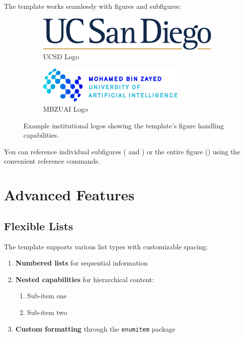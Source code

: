 \documentclass{triton}
\begin{document}
The template works seamlessly with figures and subfigures:

\begin{figure}[h]
    \centering
    \begin{subfigure}{0.45\textwidth}
        \centering
        \includegraphics[width=\textwidth]{assets/ucsd-logo.png}
        \caption{UCSD Logo}
        \label{fig:ucsd}
    \end{subfigure}
    \hfill
    \begin{subfigure}{0.45\textwidth}
        \centering
        \includegraphics[width=0.8\textwidth]{assets/mbzuai-logo.png}
        \caption{MBZUAI Logo}
        \label{fig:mbzuai}
    \end{subfigure}
    \caption{Example institutional logos showing the template's figure handling capabilities.}
    \label{fig:logos}
\end{figure}

You can reference individual subfigures ( and ) or the entire figure () using the convenient reference commands.

\section{Advanced Features}

\subsection{Flexible Lists}

The template supports various list types with customizable spacing:

\begin{enumerate}[leftmargin=20pt]
    \item \textbf{Numbered lists} for sequential information
    \item \textbf{Nested capabilities} for hierarchical content:
    \begin{enumerate}[label=(\alph*)]
        \item Sub-item one
        \item Sub-item two
    \end{enumerate}
    \item \textbf{Custom formatting} through the \texttt{enumitem} package
\end{enumerate}
\end{document}
